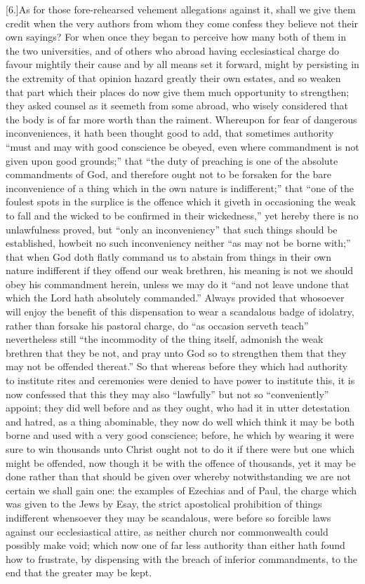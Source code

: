 [6.]As for those fore-rehearsed vehement allegations against it, shall we give them credit when the very authors from whom they come confess they believe not their own sayings? For when once they began to perceive how many both of them in the two universities, and of others who abroad having ecclesiastical charge do favour mightily their cause and by all means set it forward, might by persisting in the extremity of that opinion hazard greatly their own estates, and so weaken that part which their places do now give them much opportunity to strengthen; they asked counsel as it seemeth from some abroad, who wisely considered that the body is of far  more worth than the raiment. Whereupon for fear of dangerous inconveniences, it hath been thought good to add, that sometimes authority “must and may with good conscience be obeyed, even where commandment is not given upon good grounds;” that “the duty of preaching is one of the absolute commandments of God, and therefore ought not to be forsaken for the bare inconvenience of a thing which in the own nature is indifferent;” that “one of the foulest spots in the surplice is the offence which it giveth in occasioning the weak to fall and the wicked to be confirmed in their wickedness,” yet hereby there is no unlawfulness proved, but “only an inconveniency” that such things should be established, howbeit no such inconveniency neither “as may not be borne with;” that when God doth flatly command us to abstain from things in their own nature indifferent if they offend our weak brethren, his meaning is not we should obey his commandment herein, unless we may do it “and not leave undone that which the Lord hath absolutely  commanded.”
 Always provided that whosoever will enjoy the benefit of this dispensation to wear a scandalous badge of idolatry, rather than forsake his pastoral charge, do “as occasion serveth teach” nevertheless still “the incommodity of the thing itself, admonish the weak brethren that they be not, and pray unto God so to strengthen them that they may not be offended thereat.” So that whereas before they which had authority to institute rites and ceremonies were denied to have power to institute this, it is now confessed that this they may also “lawfully” but not so “conveniently” appoint; they did well before and as they ought, who had it in utter detestation and hatred, as a thing abominable, they now do well which think it may be both borne and used with a very good conscience; before, he which by wearing it were sure to win thousands unto Christ ought not to do it if there were but one which might be offended, now though it be with the offence of thousands, yet it may be done rather than that should be given over whereby notwithstanding we are not certain we shall gain one: the examples of Ezechias and of Paul, the charge which was given to the Jews by Esay, the strict apostolical prohibition of things indifferent whensoever they may be scandalous, were before so forcible laws against our ecclesiastical attire, as neither church nor commonwealth could possibly make void; which now one of far less authority than either hath found how to frustrate, by dispensing with the breach of inferior commandments, to the end that the greater may be kept.

